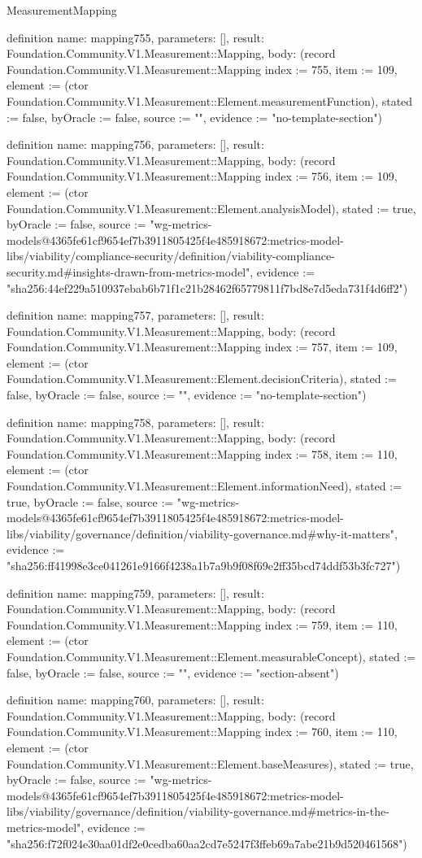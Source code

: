 \begin{lexlean}{MeasurementMapping}
\begin{semanticmodule}
definition{
  name: mapping755,
  parameters: [],
  result: Foundation.Community.V1.Measurement::Mapping,
  body: (record Foundation.Community.V1.Measurement::Mapping {index := 755, item := 109, element := (ctor Foundation.Community.V1.Measurement::Element.measurementFunction), stated := false, byOracle := false, source := "", evidence := "no-template-section"})
}

definition{
  name: mapping756,
  parameters: [],
  result: Foundation.Community.V1.Measurement::Mapping,
  body: (record Foundation.Community.V1.Measurement::Mapping {index := 756, item := 109, element := (ctor Foundation.Community.V1.Measurement::Element.analysisModel), stated := true, byOracle := false, source := "wg-metrics-models@4365fe61cf9654ef7b3911805425f4e485918672:metrics-model-libs/viability/compliance-security/definition/viability-compliance-security.md#insights-drawn-from-metrics-model", evidence := "sha256:44ef229a510937ebab6b71f1c21b28462f65779811f7bd8e7d5eda731f4d6ff2"})
}

definition{
  name: mapping757,
  parameters: [],
  result: Foundation.Community.V1.Measurement::Mapping,
  body: (record Foundation.Community.V1.Measurement::Mapping {index := 757, item := 109, element := (ctor Foundation.Community.V1.Measurement::Element.decisionCriteria), stated := false, byOracle := false, source := "", evidence := "no-template-section"})
}

definition{
  name: mapping758,
  parameters: [],
  result: Foundation.Community.V1.Measurement::Mapping,
  body: (record Foundation.Community.V1.Measurement::Mapping {index := 758, item := 110, element := (ctor Foundation.Community.V1.Measurement::Element.informationNeed), stated := true, byOracle := false, source := "wg-metrics-models@4365fe61cf9654ef7b3911805425f4e485918672:metrics-model-libs/viability/governance/definition/viability-governance.md#why-it-matters", evidence := "sha256:ff41998e3ce041261e9166f4238a1b7a9b9f08f69e2ff35bcd74ddf53b3fc727"})
}

definition{
  name: mapping759,
  parameters: [],
  result: Foundation.Community.V1.Measurement::Mapping,
  body: (record Foundation.Community.V1.Measurement::Mapping {index := 759, item := 110, element := (ctor Foundation.Community.V1.Measurement::Element.measurableConcept), stated := false, byOracle := false, source := "", evidence := "section-absent"})
}

definition{
  name: mapping760,
  parameters: [],
  result: Foundation.Community.V1.Measurement::Mapping,
  body: (record Foundation.Community.V1.Measurement::Mapping {index := 760, item := 110, element := (ctor Foundation.Community.V1.Measurement::Element.baseMeasures), stated := true, byOracle := false, source := "wg-metrics-models@4365fe61cf9654ef7b3911805425f4e485918672:metrics-model-libs/viability/governance/definition/viability-governance.md#metrics-in-the-metrics-model", evidence := "sha256:f72f024e30aa01df2e0cedba60aa2cd7e5247f3ffeb69a7abe21b9d520461568"})
}


\end{semanticmodule}
\end{lexlean}
